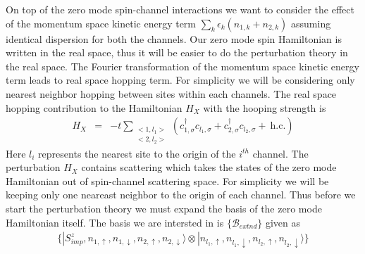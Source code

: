 \documentclass[reprint,prb,superscriptaddress]{revtex4-1}
\begin{document}
On top of the zero mode spin-channel interactions we want to consider the effect of the momentum space kinetic energy term $\sum_{k}\epsilon_k (n_{1,k}+n_{2,k})$ assuming identical dispersion for both the channels. Our zero mode spin Hamiltonian is written in the real space, thus it will be easier to do the perturbation theory in the real space. The Fourier transformation of the momentum space kinetic energy  term leads to real space hopping term. For simplicity we will be considering only nearest neighbor hopping between sites within each channels. The real space hopping contribution to the Hamiltonian $H_X$ with the hooping strength is 
\begin{eqnarray}
H_{X} &=& -t \displaystyle\sum_{\substack{<1,l_1> \\ <2,l_2>}} (c^{\dagger}_{1,\sigma}c_{l_1,\sigma}+c^{\dagger}_{2,\sigma}c_{l_2,\sigma}+ ~\textrm{h.c.})
\end{eqnarray}
Here $l_i$ represents the nearest site to the origin of the $i^{th}$ channel. The perturbation $H_X$ contains scattering which takes the states of the zero mode Hamiltonian out of spin-channel scattering space. For simplicity we will be keeping only one neareast neighbor to the origin of each channel. Thus before we start the perturbation theory we must expand the basis of the zero mode Hamiltonian itself. The basis we are intersted in is $\{\mathcal{B}_{extnd}\}$ given as 
\begin{eqnarray}
\{|S^z_{imp},n_{1,\uparrow},n_{1,\downarrow},n_{2,\uparrow},n_{2,\downarrow}\rangle \otimes |n_{l_1,\uparrow},n_{l_1,\downarrow},n_{l_2,\uparrow},n_{l_2,\downarrow}\rangle\} \nonumber
\end{eqnarray}
\end{document}
